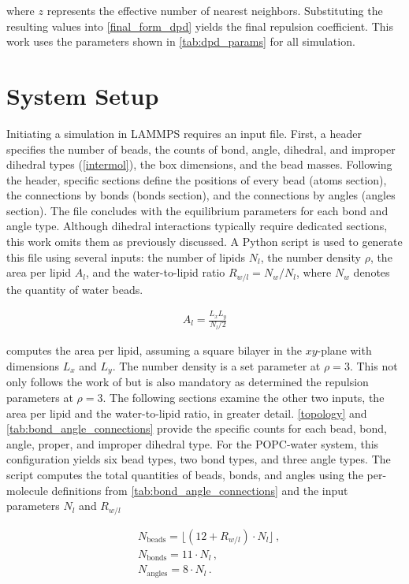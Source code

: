 \documentclass[
    11pt,
    a4paper,
    oneside,        %
    BCOR=10mm,      %
    parskip=half,   %
    listof=nototoc,   %
    bibliography=totoc %
]{scrreprt}
\begin{document}
where $z$ represents the effective number of nearest neighbors. Substituting the resulting values into \cref{final_form_dpd} yields the final repulsion coefficient. This work uses the parameters shown in \cref{tab:dpd_params} for all simulation.

\section{System Setup}\label{sec:sys_setup}

Initiating a simulation in LAMMPS requires an input file. First, a header specifies the number of beads, the counts of bond, angle, dihedral, and improper dihedral types (\cref{intermol}), the box dimensions, and the bead masses. Following the header, specific sections define the positions of every bead (atoms section), the connections by bonds (bonds section), and the connections by angles (angles section). The file concludes with the equilibrium parameters for each bond and angle type. Although dihedral interactions typically require dedicated sections, this work omits them as previously discussed. A Python script is used to generate this file using several inputs: the number of lipids $N_l$, the number density $\rho$, the area per lipid $A_l$, and the water-to-lipid ratio $R_{w/l} = N_w/N_l$, where $N_w$ denotes the quantity of water beads. 

\begin{align}
    A_l = \frac{L_x L_y}{N_l/2} \label{eq:def_apl}
\end{align}

computes the area per lipid, assuming a square bilayer in the $xy$-plane with dimensions $L_x$ and $L_y$. The number density is a set parameter at $\rho=3$. This not only follows the work of \citeauthor{DPD_groot_warren} \cite{DPD_groot_warren} but is also mandatory as \citeauthor{Wang2024} \cite{Wang2024} determined the repulsion parameters at $\rho = 3$. The following sections examine the other two inputs, the area per lipid and the water-to-lipid ratio, in greater detail. \cref{topology} and \cref{tab:bond_angle_connections} provide the specific counts for each bead, bond, angle, proper, and improper dihedral type. For the POPC-water system, this configuration yields six bead types, two bond types, and three angle types. The script computes the total quantities of beads, bonds, and angles using the per-molecule definitions from \cref{tab:bond_angle_connections} and the input parameters $N_l$ and $R_{w/l}$

\begin{align}
    &N_\text{beads} = \lfloor(12 + R_{w/l}) \cdot N_l\rfloor\, , \label{eq:num_beads}\\ 
    &N_\text{bonds} = 11 \cdot N_l\, ,\\
    &N_\text{angles} = 8 \cdot N_l\, .
\end{align}
\end{document}
